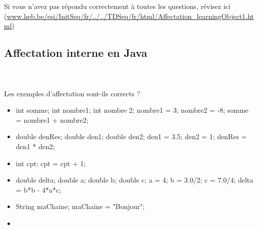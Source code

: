\documentclass[11pt,a4paper]{article}
\begin{document}
        Si vous n'avez pas r\'epondu correctement \`a toutes les questions, 
        r\'evisez ici (\url{www.heb.be/esi/InitSeq/fr/../../TDSeq/fr/html/Affectation\_learningObject1.html})
            \par
        \subsection{Affectation interne en Java}
			
		\subparagraph{} 
		
                \textcolor{white}{.} \par
            Les exemples d'affectation sont-ils corrects ?
						
            \begin{itemize} 
        
            \item[ \ding{"6F} ] \begin{Java}
  
int somme;
int nombre1;
int nombre 2;
nombre1 = 3;
nombre2 = -8;
somme = nombre1 + nombre2;\end{Java}
        
            \item[ \ding{"6F} ] \begin{Java}

double denRes;
double den1;
double den2;
den1 = 3.5;
den2 = 1;
denRes = den1 * den2;\end{Java}
        
            \item[ \ding{"6F} ] \begin{Java}
						
int cpt; 
cpt = cpt + 1;\end{Java}
        
            \item[ \ding{"6F} ] \begin{Java}
						
double delta; 
double a; 
double b; 
double c; 
a = 4; 
b = 3.0/2; 
c = 7.0/4; 
delta = b*b - 4*a*c;\end{Java}
        
            \item[ \ding{"6F} ] \begin{Java}
						
String maChaine; 
maChaine = "Bonjour";\end{Java}
        
            \item[ \ding{"6F} ] \begin{Java}
						

\end{Java}
\end{itemize}
\end{document}
